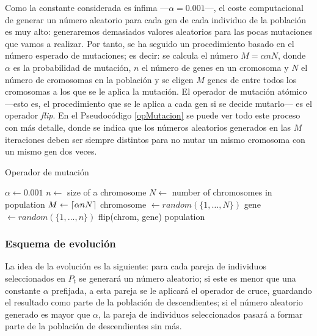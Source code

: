 \documentclass[a4paper, 11pt, titlepage]{article}
\begin{document}
    Como la constante considerada es ínfima ---$\alpha = 0.001$---, el coste computacional de generar un número aleatorio para cada gen de cada individuo de la población es muy alto: generaremos demasiados valores aleatorios para las pocas mutaciones que vamos a realizar. Por tanto, se ha seguido un procedimiento basado en el número esperado de mutaciones; es decir: se calcula el número $M = \alpha n N$, donde $\alpha$ es la probabilidad de mutación, $n$ el número de genes en un cromosoma y $N$ el número de cromosomas en la población y se eligen $M$ genes de entre todos los cromosomas a los que se le aplica la mutación. El operador de mutación atómico ---esto es, el procedimiento que se le aplica a cada gen si se decide mutarlo--- es el operador \emph{flip}. En el Pseudocódigo \ref{opMutacion} se puede ver todo este proceso con más detalle, donde se indica que los números aleatorios generados en las $M$ iteraciones deben ser siempre distintos para no mutar un mismo cromosoma con un mismo gen dos veces.

    \begin{algorithm}
        \caption{Operador de mutación}\label{opMutacion}
        \begin{algorithmic}[1]
            \State $\alpha \gets 0.001$
            \State $n \gets$ size of a chromosome
            \State $N \gets$ number of chromosomes in population
            \State $M \gets \lceil\alpha n N\rceil$
             
                \State{}
                \State chromosome $\gets random(\{1,\dots,N\})$
                \State gene $\gets random(\{1,\dots,n\})$
                \State flip(chrom, gene)
            \EndFor
            \State \Return population
            \EndFunction
        \end{algorithmic}
    \end{algorithm}

    \subsubsection*{Esquema de evolución}

    La idea de la evolución es la siguiente: para cada pareja de individuos seleccionados en $P_t$ se generará un número aleatorio; si este es menor que una constante $\alpha$ prefijada, a esta pareja se le aplicará el operador de cruce, guardando el resultado como parte de la población de descendientes; si el número aleatorio generado es mayor que $\alpha$, la pareja de individuos seleccionados pasará a formar parte de la población de descendientes sin más.
\end{document}
